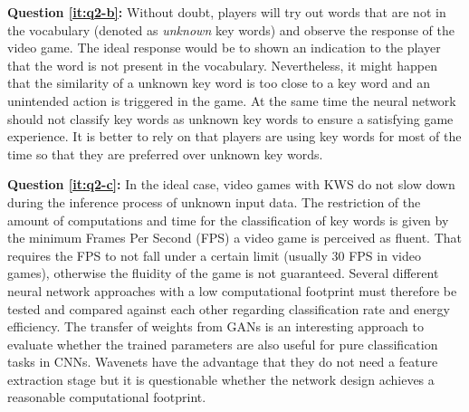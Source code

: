 \textbf{Question \ref{it:q2-b}:} 
Without doubt, players will try out words that are not in the vocabulary (denoted as \emph{unknown} key words) and observe the response of the video game.
The ideal response would be to shown an indication to the player that the word is not present in the vocabulary. 
Nevertheless, it might happen that the similarity of a unknown key word is too close to a key word and an unintended action is triggered in the game. 
At the same time the neural network should not classify key words as unknown key words to ensure a satisfying game experience.
It is better to rely on that players are using key words for most of the time so that they are preferred over unknown key words.

\textbf{Question \ref{it:q2-c}:}
In the ideal case, video games with KWS do not slow down during the inference process of unknown input data.
The restriction of the amount of computations and time for the classification of key words is given by the minimum Frames Per Second (FPS) a video game is perceived as fluent.
That requires the FPS to not fall under a certain limit (usually 30 FPS in video games), otherwise the fluidity of the game is not guaranteed.
Several different neural network approaches with a low computational footprint must therefore be tested and compared against each other regarding classification rate and energy efficiency.
The transfer of weights from GANs is an interesting approach to evaluate whether the trained parameters are also useful for pure classification tasks in CNNs.
Wavenets have the advantage that they do not need a feature extraction stage but it is questionable whether the network design achieves a reasonable computational footprint.



